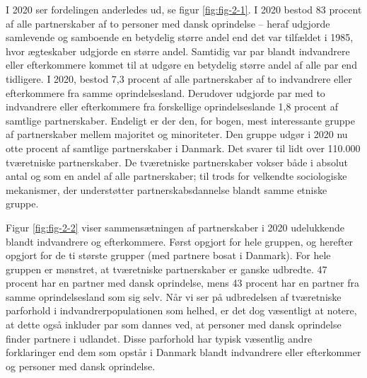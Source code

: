 \documentclass[
]{book}
\begin{document}
I 2020 ser fordelingen anderledes ud, se figur \ref{fig:fig-2-1}. I 2020 bestod 83 procent af alle partnerskaber af to personer med dansk oprindelse -- heraf udgjorde samlevende og samboende en betydelig større andel end det var tilfældet i 1985, hvor ægteskaber udgjorde en større andel. Samtidig var par blandt indvandrere eller efterkommere kommet til at udgøre en betydelig større andel af alle par end tidligere. I 2020, bestod 7,3 procent af alle partnerskaber af to indvandrere eller efterkommere fra samme oprindelsesland. Derudover udgjorde par med to indvandrere eller efterkommere fra forskellige oprindelseslande 1,8 procent af samtlige partnerskaber. Endeligt er der den, for bogen, mest interessante gruppe af partnerskaber mellem majoritet og minoriteter. Den gruppe udgør i 2020 nu otte procent af samtlige partnerskaber i Danmark. Det svarer til lidt over 110.000 tværetniske partnerskaber. De tværetniske partnerskaber vokser både i absolut antal og som en andel af alle partnerskaber; til trods for velkendte sociologiske mekanismer, der understøtter partnerskabsdannelse blandt samme etniske gruppe.

Figur \ref{fig:fig-2-2} viser sammensætningen af partnerskaber i 2020 udelukkende blandt indvandrere og efterkommere. Først opgjort for hele gruppen, og herefter opgjort for de ti største grupper (med partnere bosat i Danmark). For hele gruppen er mønstret, at tværetniske partnerskaber er ganske udbredte. 47 procent har en partner med dansk oprindelse, mens 43 procent har en partner fra samme oprindelsesland som sig selv. Når vi ser på udbredelsen af tværetniske parforhold i indvandrerpopulationen som helhed, er det dog væsentligt at notere, at dette også inkluder par som dannes ved, at personer med dansk oprindelse finder partnere i udlandet. Disse parforhold har typisk væsentlig andre forklaringer end dem som opstår i Danmark blandt indvandrere eller efterkommer og personer med dansk oprindelse.
\end{document}
